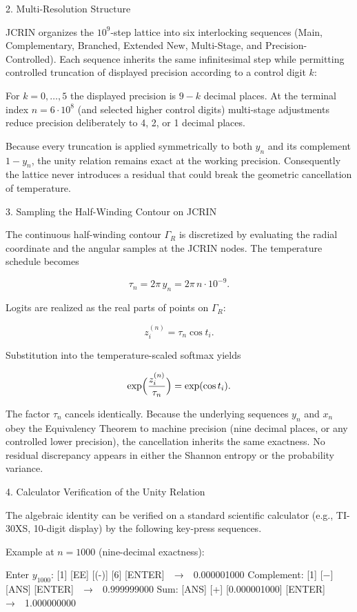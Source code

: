2. Multi-Resolution Structure

JCRIN organizes the \(10^9\)-step lattice into six interlocking sequences (Main, Complementary, Branched, Extended New, Multi-Stage, and Precision-Controlled). Each sequence inherits the same infinitesimal step while permitting controlled truncation of displayed precision according to a control digit \(k\):

For \(k = 0,\dots,5\) the displayed precision is \(9-k\) decimal places.
At the terminal index \(n = 6\cdot10^8\) (and selected higher control digits) multi-stage adjustments reduce precision deliberately to 4, 2, or 1 decimal places.

Because every truncation is applied symmetrically to both \(y_n\) and its complement \(1-y_n\), the unity relation remains exact at the working precision. Consequently the lattice never introduces a residual that could break the geometric cancellation of temperature.

3. Sampling the Half-Winding Contour on JCRIN

The continuous half-winding contour \(\Gamma_R\) is discretized by evaluating the radial coordinate and the angular samples at the JCRIN nodes. The temperature schedule becomes

\[
\tau_n = 2\pi\, y_n = 2\pi\, n\cdot 10^{-9}.
\]

Logits are realized as the real parts of points on \(\Gamma_R\):

\[
z_i^{(n)} = \tau_n\cos t_i.
\]

Substitution into the temperature-scaled softmax yields

\[
\exp\Bigl(\frac{z_i^{(n)}}{\tau_n}\Bigr) = \exp(\cos t_i).
\]

The factor \(\tau_n\) cancels identically. Because the underlying sequences \(y_n\) and \(x_n\) obey the Equivalency Theorem to machine precision (nine decimal places, or any controlled lower precision), the cancellation inherits the same exactness. No residual discrepancy appears in either the Shannon entropy or the probability variance.

4. Calculator Verification of the Unity Relation

The algebraic identity can be verified on a standard scientific calculator (e.g., TI-30XS, 10-digit display) by the following key-press sequences.

Example at \(n=1000\) (nine-decimal exactness):

Enter \(y_{1000}\):  
  [1] [EE] [(-)] [6] [ENTER] → 0.000001000
Complement:  
  [1] [−] [ANS] [ENTER] → 0.999999000
Sum:  
  [ANS] [+] [0.000001000] [ENTER] → 1.000000000

